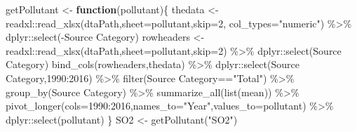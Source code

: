 \documentclass[
]{book}
\newenvironment{Shaded}{\begin{snugshade}}{\end{snugshade}}
\newcommand{\AttributeTok}[1]{\textcolor[rgb]{0.61,0.61,0.61}{#1}}
\newcommand{\ControlFlowTok}[1]{\textcolor[rgb]{0.27,0.27,0.27}{\textbf{#1}}}
\newcommand{\DecValTok}[1]{\textcolor[rgb]{0.06,0.06,0.06}{#1}}
\newcommand{\FunctionTok}[1]{\textcolor[rgb]{0,0,0}{#1}}
\newcommand{\NormalTok}[1]{#1}
\newcommand{\OtherTok}[1]{\textcolor[rgb]{0.37,0.37,0.37}{#1}}
\newcommand{\SpecialCharTok}[1]{\textcolor[rgb]{0,0,0}{#1}}
\newcommand{\StringTok}[1]{\textcolor[rgb]{0.5,0.5,0.5}{#1}}
\begin{document}
\begin{Shaded}
\begin{Highlighting}[]
\NormalTok{getPollutant }\OtherTok{\textless{}{-}} \ControlFlowTok{function}\NormalTok{(pollutant)\{}
\NormalTok{  thedata }\OtherTok{\textless{}{-}}\NormalTok{ readxl}\SpecialCharTok{::}\FunctionTok{read\_xlsx}\NormalTok{(dtaPath,}\AttributeTok{sheet=}\NormalTok{pollutant,}\AttributeTok{skip=}\DecValTok{2}\NormalTok{,}
                               \AttributeTok{col\_types=}\StringTok{"numeric"}\NormalTok{) }\SpecialCharTok{\%\textgreater{}\%}
\NormalTok{     dplyr}\SpecialCharTok{::}\FunctionTok{select}\NormalTok{(}\SpecialCharTok{{-}}\StringTok{\textasciigrave{}}\AttributeTok{Source Category}\StringTok{\textasciigrave{}}\NormalTok{)}
\NormalTok{  rowheaders }\OtherTok{\textless{}{-}}\NormalTok{ readxl}\SpecialCharTok{::}\FunctionTok{read\_xlsx}\NormalTok{(dtaPath,}\AttributeTok{sheet=}\NormalTok{pollutant,}\AttributeTok{skip=}\DecValTok{2}\NormalTok{) }\SpecialCharTok{\%\textgreater{}\%}
\NormalTok{     dplyr}\SpecialCharTok{::}\FunctionTok{select}\NormalTok{(}\StringTok{\textasciigrave{}}\AttributeTok{Source Category}\StringTok{\textasciigrave{}}\NormalTok{)}
  \FunctionTok{bind\_cols}\NormalTok{(rowheaders,thedata) }\SpecialCharTok{\%\textgreater{}\%}
\NormalTok{     dplyr}\SpecialCharTok{::}\FunctionTok{select}\NormalTok{(}\StringTok{\textasciigrave{}}\AttributeTok{Source Category}\StringTok{\textasciigrave{}}\NormalTok{,}\StringTok{\textasciigrave{}}\AttributeTok{1990}\StringTok{\textasciigrave{}}\SpecialCharTok{:}\StringTok{\textasciigrave{}}\AttributeTok{2016}\StringTok{\textasciigrave{}}\NormalTok{) }\SpecialCharTok{\%\textgreater{}\%}
     \FunctionTok{filter}\NormalTok{(}\StringTok{\textasciigrave{}}\AttributeTok{Source Category}\StringTok{\textasciigrave{}}\SpecialCharTok{==}\StringTok{"Total"}\NormalTok{) }\SpecialCharTok{\%\textgreater{}\%}
     \FunctionTok{group\_by}\NormalTok{(}\StringTok{\textasciigrave{}}\AttributeTok{Source Category}\StringTok{\textasciigrave{}}\NormalTok{) }\SpecialCharTok{\%\textgreater{}\%}
     \FunctionTok{summarize\_all}\NormalTok{(}\FunctionTok{list}\NormalTok{(mean)) }\SpecialCharTok{\%\textgreater{}\%}
     \FunctionTok{pivot\_longer}\NormalTok{(}\AttributeTok{cols=}\StringTok{\textasciigrave{}}\AttributeTok{1990}\StringTok{\textasciigrave{}}\SpecialCharTok{:}\StringTok{\textasciigrave{}}\AttributeTok{2016}\StringTok{\textasciigrave{}}\NormalTok{,}\AttributeTok{names\_to=}\StringTok{"Year"}\NormalTok{,}\AttributeTok{values\_to=}\NormalTok{pollutant) }\SpecialCharTok{\%\textgreater{}\%}
\NormalTok{     dplyr}\SpecialCharTok{::}\FunctionTok{select}\NormalTok{(pollutant)}
\NormalTok{\}}
\NormalTok{SO2  }\OtherTok{\textless{}{-}} \FunctionTok{getPollutant}\NormalTok{(}\StringTok{"SO2"}\NormalTok{)}

\end{Highlighting}
\end{Shaded}
\end{document}
